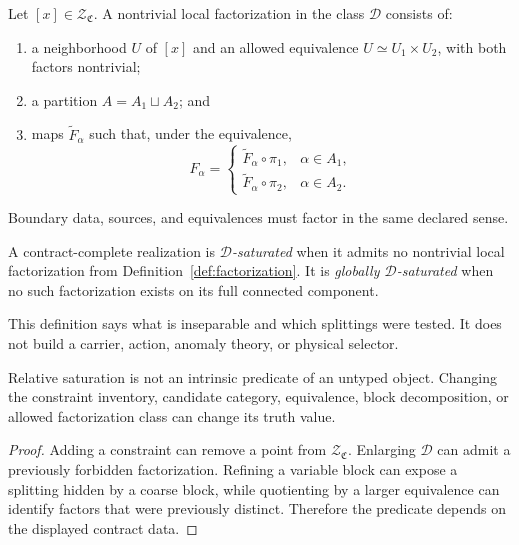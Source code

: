 \documentclass[11pt]{article}
\newcommand{\Contract}{\mathfrak C}
\newcommand{\Sol}{\mathcal Z}
\newcommand{\Decomp}{\mathcal D}
\begin{document}
\begin{definition}\label{def:factorization}
Let $[x]\in\Sol_{\Contract}$.  A nontrivial local factorization in the class
$\Decomp$ consists of:
\begin{enumerate}
\item a neighborhood $U$ of $[x]$ and an allowed equivalence
$U\simeq U_1\times U_2$, with both factors nontrivial;
\item a partition $A=A_1\sqcup A_2$; and
\item maps $\widetilde F_\alpha$ such that, under the equivalence,
\[
 F_\alpha=
 \begin{cases}
 \widetilde F_\alpha\circ\pi_1,&\alpha\in A_1,\\
 \widetilde F_\alpha\circ\pi_2,&\alpha\in A_2.
 \end{cases}
\]
\end{enumerate}
Boundary data, sources, and equivalences must factor in the same declared
sense.
\end{definition}

\begin{definition}\label{def:saturation}
A contract-complete realization is \emph{$\Decomp$-saturated} when it admits no
nontrivial local factorization from Definition~\ref{def:factorization}.
It is \emph{globally $\Decomp$-saturated} when no such factorization exists on
its full connected component.
\end{definition}

This definition says what is inseparable and which splittings were tested.  It
does not build a carrier, action, anomaly theory, or physical selector.

\begin{proposition}\label{prop:relative}
Relative saturation is not an intrinsic predicate of an untyped object.
Changing the constraint inventory, candidate category, equivalence, block
decomposition, or allowed factorization class can change its truth value.
\end{proposition}

\begin{proof}
Adding a constraint can remove a point from $\Sol_{\Contract}$.  Enlarging
$\Decomp$ can admit a previously forbidden factorization.  Refining a variable
block can expose a splitting hidden by a coarse block, while quotienting by a
larger equivalence can identify factors that were previously distinct.
Therefore the predicate depends on the displayed contract data.
\end{proof}
\end{document}
